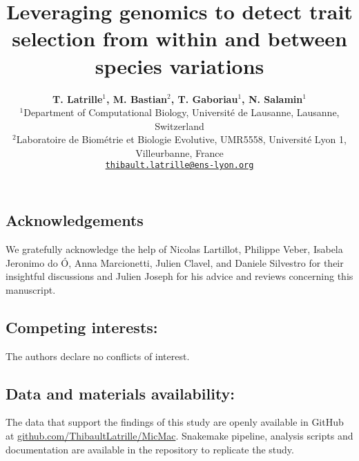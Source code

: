 \documentclass{article}
\title{Leveraging genomics to detect trait selection from within and between species variations}
\author{
\large
\textbf{T. {Latrille}$^{1}$\orcidlink{0000-0002-9643-4668}, M. {Bastian}$^{2}$, T. {Gaboriau}$^{1}$\orcidlink{0000-0001-7530-2204}, N. {Salamin}$^{1}$\orcidlink{0000-0002-3963-4954}}\\
\normalsize
$^{1}$Department of Computational Biology, Université de Lausanne, Lausanne, Switzerland\\
$^{2}$Laboratoire de Biométrie et Biologie Evolutive, UMR5558, Université Lyon 1, Villeurbanne, France \\
\texttt{\href{mailto:thibault.latrille@ens-lyon.org}{thibault.latrille@ens-lyon.org}} \\
}
\begin{document}
\maketitle

\subsection*{Acknowledgements}
 We gratefully acknowledge the help of Nicolas Lartillot, Philippe Veber, Isabela Jeronimo do Ó, Anna Marcionetti, Julien Clavel, and Daniele Silvestro for their insightful discussions and Julien Joseph for his advice and reviews concerning this manuscript.


\subsection*{Competing interests:}
The authors declare no conflicts of interest.
\subsection*{Data and materials availability:}
The data that support the findings of this study are openly available in GitHub at \href{https://github.com/ThibaultLatrille/MicMac}{github.com/ThibaultLatrille/MicMac}. Snakemake pipeline, analysis scripts and documentation are available in the repository to replicate the study.
\end{document}
